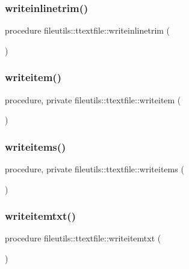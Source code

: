 \subsubsection{\texorpdfstring{writeinlinetrim()}{writeinlinetrim()}}
{\footnotesize\ttfamily procedure fileutils\+::ttextfile\+::writeinlinetrim (\begin{DoxyParamCaption}{ }\end{DoxyParamCaption})\hspace{0.3cm}{\ttfamily [private]}}

\mbox{\label{structfileutils_1_1ttextfile_a199cbe1086f30ab1781dab422aa0ee00}} 
\subsubsection{\texorpdfstring{writeitem()}{writeitem()}}
{\footnotesize\ttfamily procedure, private fileutils\+::ttextfile\+::writeitem (\begin{DoxyParamCaption}{ }\end{DoxyParamCaption})\hspace{0.3cm}{\ttfamily [private]}}

\mbox{\label{structfileutils_1_1ttextfile_a1d830488b51cccb1c6f065fda6177b8b}} 
\subsubsection{\texorpdfstring{writeitems()}{writeitems()}}
{\footnotesize\ttfamily procedure, private fileutils\+::ttextfile\+::writeitems (\begin{DoxyParamCaption}{ }\end{DoxyParamCaption})\hspace{0.3cm}{\ttfamily [private]}}

\mbox{\label{structfileutils_1_1ttextfile_a254af563ac2739594f8d6901900a9b28}} 
\subsubsection{\texorpdfstring{writeitemtxt()}{writeitemtxt()}}
{\footnotesize\ttfamily procedure fileutils\+::ttextfile\+::writeitemtxt (\begin{DoxyParamCaption}{ }\end{DoxyParamCaption})\hspace{0.3cm}{\ttfamily [private]}}

